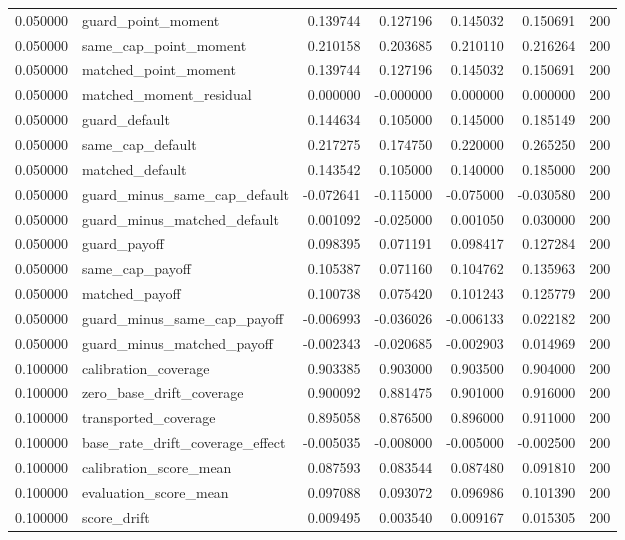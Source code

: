 \begin{tabular}{rlrrrrr}
0.050000 & guard\_point\_moment & 0.139744 & 0.127196 & 0.145032 & 0.150691 & 200 \\
0.050000 & same\_cap\_point\_moment & 0.210158 & 0.203685 & 0.210110 & 0.216264 & 200 \\
0.050000 & matched\_point\_moment & 0.139744 & 0.127196 & 0.145032 & 0.150691 & 200 \\
0.050000 & matched\_moment\_residual & 0.000000 & -0.000000 & 0.000000 & 0.000000 & 200 \\
0.050000 & guard\_default & 0.144634 & 0.105000 & 0.145000 & 0.185149 & 200 \\
0.050000 & same\_cap\_default & 0.217275 & 0.174750 & 0.220000 & 0.265250 & 200 \\
0.050000 & matched\_default & 0.143542 & 0.105000 & 0.140000 & 0.185000 & 200 \\
0.050000 & guard\_minus\_same\_cap\_default & -0.072641 & -0.115000 & -0.075000 & -0.030580 & 200 \\
0.050000 & guard\_minus\_matched\_default & 0.001092 & -0.025000 & 0.001050 & 0.030000 & 200 \\
0.050000 & guard\_payoff & 0.098395 & 0.071191 & 0.098417 & 0.127284 & 200 \\
0.050000 & same\_cap\_payoff & 0.105387 & 0.071160 & 0.104762 & 0.135963 & 200 \\
0.050000 & matched\_payoff & 0.100738 & 0.075420 & 0.101243 & 0.125779 & 200 \\
0.050000 & guard\_minus\_same\_cap\_payoff & -0.006993 & -0.036026 & -0.006133 & 0.022182 & 200 \\
0.050000 & guard\_minus\_matched\_payoff & -0.002343 & -0.020685 & -0.002903 & 0.014969 & 200 \\
0.100000 & calibration\_coverage & 0.903385 & 0.903000 & 0.903500 & 0.904000 & 200 \\
0.100000 & zero\_base\_drift\_coverage & 0.900092 & 0.881475 & 0.901000 & 0.916000 & 200 \\
0.100000 & transported\_coverage & 0.895058 & 0.876500 & 0.896000 & 0.911000 & 200 \\
0.100000 & base\_rate\_drift\_coverage\_effect & -0.005035 & -0.008000 & -0.005000 & -0.002500 & 200 \\
0.100000 & calibration\_score\_mean & 0.087593 & 0.083544 & 0.087480 & 0.091810 & 200 \\
0.100000 & evaluation\_score\_mean & 0.097088 & 0.093072 & 0.096986 & 0.101390 & 200 \\
0.100000 & score\_drift & 0.009495 & 0.003540 & 0.009167 & 0.015305 & 200 \\

\end{tabular}

